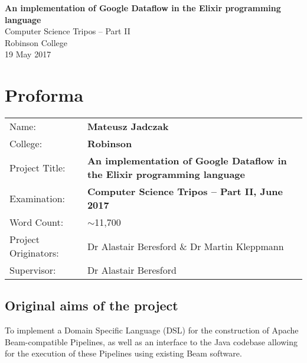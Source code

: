 
\begin{titlepage}

\vspace*{60mm}
\begin{center}
\Huge
\textbf{An implementation of Google Dataflow in the Elixir programming language} \\[5mm]
Computer Science Tripos -- Part II \\[5mm]
Robinson College \\[5mm]
19 May 2017 \\[20mm]
\end{center}
\end{titlepage}



{\let\cleardoublepage\clearpage \chapter*{Proforma} %

{\large\tabulinesep=1mm
\begin{tabu}{lX[p]}
Name:               & \textbf {Mateusz Jadczak}                       \\
College:            & \textbf {Robinson}                     \\
Project Title:      & {\textbf{An implementation of Google Dataflow in the Elixir programming language}} \\
Examination:        & \textbf {Computer Science Tripos -- Part II, June 2017}  \\
Word Count:         & $\sim$11,700\footnotemark[1]  \\
Project Originators: & Dr Alastair Beresford \& Dr Martin Kleppmann     \\
Supervisor:         &   Dr Alastair Beresford           \\ 
\end{tabu}
}

\bigskip

\section*{Original aims of the project}

To implement a Domain Specific Language (DSL) for the construction of Apache Beam-compatible Pipelines, as well as an interface to the Java codebase allowing for the execution of these Pipelines using existing Beam software.

}
